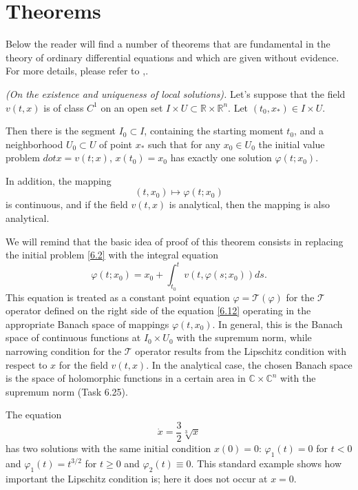 \section{Theorems}
Below the reader will find a number of theorems that are fundamental in the theory of ordinary differential equations and which are given without evidence. For more details, please refer to \cite{Ar1},\cite{Pal}.

\begin{theorem}\label{theo:6.5}
	\emph{(On the existence and uniqueness of local solutions).}
	Let's suppose that the field $v (t, x)$ is of class $C^1$ on an open set $I \times U \subset \mathbb{R}\times \mathbb{R}^{n}$. Let $(t_{0},x_{\ast })\in I\times U$.
	
	Then there is the segment $I_{0}\subset I$, containing the starting moment $t_{0}$, and a neighborhood $U_{0}\subset U$ of point $x_{\ast }$ such that for any $x_{0}\in U_{0}$ the initial value problem $dot{x}=v(t;x)$, $x(t_{0})=x_{0}$ has exactly one solution $\varphi (t;x_{0})$.
	
	In addition, the mapping
	\begin{equation}
	\label{6.11}
	\left( t,x_{0}\right) \longmapsto \varphi (t;x_{0})
	\end{equation}
	is continuous, and if the field $v(t,x)$ is analytical, then the mapping is also analytical.
\end{theorem}

We will remind that the basic idea of proof of this theorem consists in replacing the initial problem \eqref{6.2} with the integral equation
\begin{equation}
\label{6.12}
\varphi (t;x_{0})=x_{0}+\int_{t_{0}}^{t}v(t,\varphi (s;x_{0}))ds.
\end{equation}
This equation is treated as a constant point equation $\varphi = \mathcal{T}(\varphi )$ for the $\mathcal{T}$ operator defined on the right side of the equation \eqref{6.12} operating in the appropriate Banach space of mappings $\varphi (t,x_{0})$. In general, this is the Banach space of continuous functions at $I_{0}\times U_{0}$ with the supremum norm, while narrowing condition for the $\mathcal{T}$ operator results from the Lipschitz condition with respect to $x$ for the field $v (t, x)$. In the analytical case, the chosen Banach space is the space of holomorphic functions in a certain area in $\mathbb{C}\times \mathbb{C}^{n}$ with the supremum norm (Task 6.25).

\begin{example}
	The equation
	$$
	\dot{x}=\frac{3}{2}\sqrt[3]{x}
	$$
	has two solutions with the same initial condition $x(0) = 0$: $\varphi _{1}(t)=0$ for $t<0$ and $\varphi _{1}(t) = t^{3/2}$ for $t\geq 0$ and $\varphi _{2}(t) \equiv 0$. This standard example shows how important the Lipschitz condition is; here it does not occur at $x = 0$.
\end{example}

